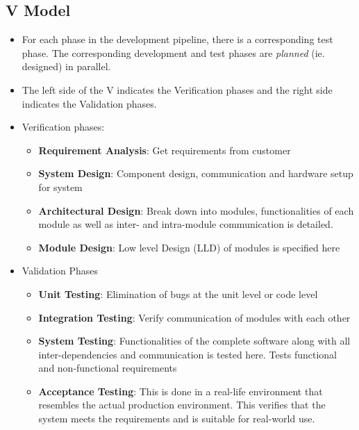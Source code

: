 \documentclass{article}
\begin{document}
\subsection{V Model}
\begin{itemize}
    \item For each phase in the development pipeline, there is a corresponding test phase. The corresponding development and test phases are \textit{planned} (ie. designed) in parallel.
    
    \item The left side of the V indicates the Verification phases and the right side indicates the Validation phases.
    
    \item Verification phases:
    \begin{itemize}
        \item \textbf{Requirement Analysis}: Get requirements from customer
        
        \item \textbf{System Design}: Component design, communication and hardware setup for system
        
        \item \textbf{Architectural Design}: Break down into modules, functionalities of each module as well as inter- and intra-module communication is detailed. 
        
        \item \textbf{Module Design}: Low level Design (LLD) of modules is specified here
    \end{itemize}
    
    \item Validation Phases
    \begin{itemize}
        \item \textbf{Unit Testing}: Elimination of bugs at the unit level or code level
        
        \item \textbf{Integration Testing}: Verify communication of modules with each other
        
        \item \textbf{System Testing}: Functionalities of the complete software along with all inter-dependencies and communication is tested here. Tests functional and non-functional requirements
        
        \item \textbf{Acceptance Testing}: This is done in a real-life environment that resembles the actual production environment. This verifies that the system meets the requirements and is suitable for real-world use. 
    \end{itemize}
\end{itemize}
\end{document}

